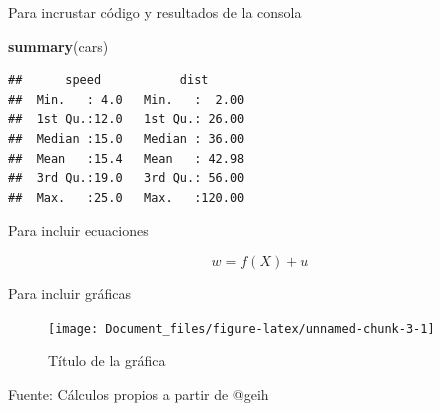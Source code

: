 \documentclass[
  11pt,
  letterpaper,
]{article}
\newenvironment{Shaded}{\begin{snugshade}}{\end{snugshade}}
\newcommand{\FunctionTok}[1]{\textcolor[rgb]{0.13,0.29,0.53}{\textbf{#1}}}
\newcommand{\NormalTok}[1]{#1}
\begin{document}
Para incrustar código y resultados de la consola

\begin{Shaded}
\begin{Highlighting}[]
\FunctionTok{summary}\NormalTok{(cars)}
\end{Highlighting}
\end{Shaded}

\begin{verbatim}
##      speed           dist       
##  Min.   : 4.0   Min.   :  2.00  
##  1st Qu.:12.0   1st Qu.: 26.00  
##  Median :15.0   Median : 36.00  
##  Mean   :15.4   Mean   : 42.98  
##  3rd Qu.:19.0   3rd Qu.: 56.00  
##  Max.   :25.0   Max.   :120.00
\end{verbatim}

Para incluir ecuaciones

\[
w=f(X)+u
\]

Para incluir gráficas

\begin{figure}

{\centering \texttt{[image: Document\_files/figure-latex/unnamed-chunk-3-1]} 

}

\caption{Título de la gráfica}\label{fig:unnamed-chunk-3}
\end{figure}
\begin{center}\footnotesize{Fuente: Cálculos propios a partir de @geih}\end{center}
\end{document}
